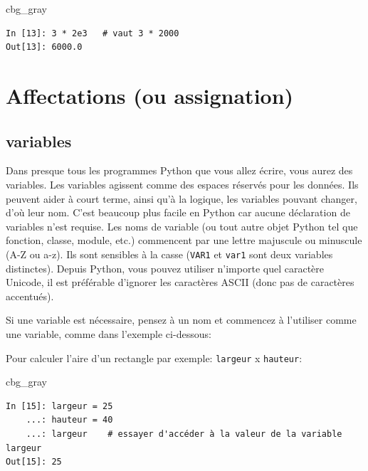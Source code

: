 \documentclass[%
oneside,                 %
final,                   %
10pt]{article}
\newenvironment{_cod_tight}[1]{
   \def\FrameCommand{\colorbox{#1}}
   \FrameRule0.6pt\MakeFramed {\FrameRestore}\vskip3mm}
   {\vskip0mm\endMakeFramed}
\newenvironment{cod}[1]{
\bgroup\rmfamily
\fboxsep=0mm\relax
\begin{_cod_tight}{#1}
\list{}{\parsep=-2mm\parskip=0mm\topsep=0pt\leftmargin=2mm
\rightmargin=2\leftmargin\leftmargin=4pt\relax}
\item\relax}
{\endlist\end{_cod_tight}\egroup}
\begin{document}
\begin{cod}{cbg_gray}\begin{verbatim}
In [13]: 3 * 2e3   # vaut 3 * 2000
Out[13]: 6000.0
\end{verbatim}
\end{cod}
\noindent

\section{Affectations (ou assignation)}

\subsection{variables}
Dans presque tous les programmes Python que vous allez écrire, vous aurez des variables. Les variables agissent comme des espaces réservés pour les données. Ils peuvent aider à court terme, ainsi qu’à la logique, les variables pouvant changer, d’où leur nom. C’est beaucoup plus facile en Python car aucune déclaration de variables n’est requise. Les noms de variable (ou tout autre objet Python tel que fonction, classe, module, etc.) commencent par une lettre majuscule ou minuscule (A-Z ou a-z). Ils sont sensibles à la casse (\texttt{VAR1} et \texttt{var1} sont deux variables distinctes). Depuis Python, vous pouvez utiliser n’importe quel caractère Unicode, il est préférable d’ignorer les caractères ASCII (donc pas de caractères accentués).

Si une variable est nécessaire, pensez à un nom et commencez à l'utiliser comme une variable, comme dans l'exemple ci-dessous:

Pour calculer l'aire d'un rectangle par exemple: \texttt{largeur} x \texttt{hauteur}:
\begin{cod}{cbg_gray}\begin{verbatim}
In [15]: largeur = 25
    ...: hauteur = 40
    ...: largeur    # essayer d'accéder à la valeur de la variable largeur
Out[15]: 25
\end{verbatim}
\end{cod}
\noindent
\end{document}
